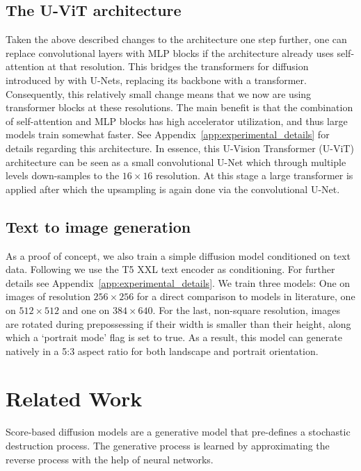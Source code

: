 \subsection{The U-ViT architecture}
Taken the above described changes to the architecture one step further, one can replace convolutional layers with MLP blocks if the architecture already uses self-attention at that resolution. This bridges the transformers for diffusion introduced by \citep{peebles2022scalable} with U-Nets, replacing its backbone with a transformer. Consequently, this relatively small change means that we now are using transformer blocks at these resolutions. The main benefit is that the combination of self-attention and MLP blocks has high accelerator utilization, and thus large models train somewhat faster. See Appendix~\ref{app:experimental_details} for details regarding this architecture. In essence, this U-Vision Transformer (U-ViT) architecture can be seen as a small convolutional U-Net which through multiple levels down-samples to the $16 \times 16$ resolution. At this stage a large transformer is applied after which the upsampling is again done via the convolutional U-Net.

\subsection{Text to image generation}
As a proof of concept, we also train a simple diffusion model conditioned on text data. Following \citep{saharia2022imagen} we use the T5 XXL \citep{raffel2020exploring} text encoder as conditioning. For further details see Appendix~\ref{app:experimental_details}. We train three models: One on images of resolution $256 \times 256$ for a direct comparison to models in literature, one on $512 \times 512$ and one on $384 \times 640$. For the last, non-square resolution, images are rotated during prepossessing if their width is smaller than their height, along which a `portrait mode' flag is set to true. As a result, this model can generate natively in a 5:3 aspect ratio for both landscape and portrait orientation.
\section{Related Work}
Score-based diffusion models \citep{sohldickstein2015diffusion,song2019generativemodellingestimatinggradient,ho2020denoising} are a generative model that pre-defines a stochastic destruction process. The generative process is learned by approximating the reverse process with the help of neural networks. 

